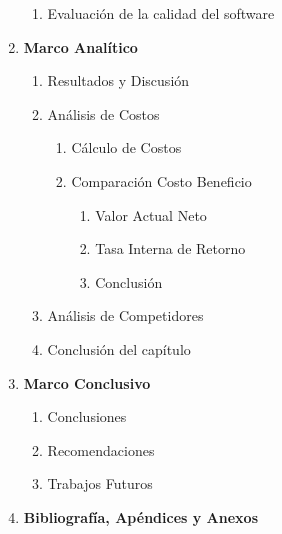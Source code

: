 \begin{enumerate}[label*=\arabic*.]
\begin{enumerate}[label*=\arabic*.]
            \item Evaluación de la calidad del software
        \end{enumerate}
    \item \textbf{Marco Analítico}
        \begin{enumerate}[label*=\arabic*.]
            \item Resultados y Discusión
            \item Análisis de Costos
                \begin{enumerate}[label*=\arabic*.]
                    \item Cálculo de Costos
                    \item Comparación Costo Beneficio
                    \begin{enumerate}[label*=\arabic*.]
                        \item Valor Actual Neto
                        \item Tasa Interna de Retorno
                        \item Conclusión
                    \end{enumerate}
                \end{enumerate}
            \item Análisis de Competidores
            \item Conclusión del capítulo
        \end{enumerate}
    \item \textbf{Marco Conclusivo}
        \begin{enumerate}[label*=\arabic*.]
            \item Conclusiones
            \item Recomendaciones
            \item Trabajos Futuros
        \end{enumerate}
    \item \textbf{Bibliografía, Apéndices y Anexos}
\end{enumerate}